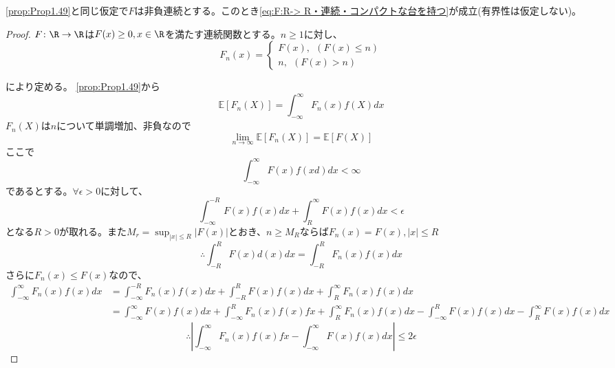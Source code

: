    \ref{prop:Prop1.49}と同じ仮定で$F$は非負連続とする。このとき\eqref{eq:F:R-> R・連続・コンパクトな台を持つ}が成立(有界性は仮定しない)。
\begin{proof}
    $F\colon \R\to \R$は$F(x)\ge 0, x\in \R$を満たす連続関数とする。$n\ge 1$に対し、
\begin{equation}
    F_n(x)
    = 
\begin{cases}
    F(x),\ \ (F(x)\le n)\\
    n,\ \ (F(x)> n)
\end{cases}
\end{equation}
\begin{tikzpicture}
\end{tikzpicture}
    により定める。
    \ref{prop:Prop1.49}から
\begin{equation}
    \mathbb{E}[F_n(X)]= \int_{-\infty}^\infty F_n(x)f(X)dx
\end{equation}
    $F_n(X)$は$n$について単調増加、非負なので
\begin{equation}
    \lim_{n\to \infty} \mathbb{E}[F_n(X)]= \mathbb{E}[F(X)]
\end{equation}
    ここで
\begin{equation}
    \int_{-\infty}^\infty F(x)f(xd)dx< \infty
\end{equation}
    であるとする。$\forall \epsilon> 0$に対して、
\begin{equation}
    \int_{-\infty}^{-R} F(x)f(x)dx+ \int_R^\infty F(x)f(x)dx< \epsilon
\end{equation}
    となる$R> 0$が取れる。また$M_r= \sup_{|x|\le R} |F(x)|$とおき、$n\ge M_R$ならば$F_n(x)= F(x), |x|\le R$
\begin{equation}
    \therefore \int_{-R}^R F(x)d(x)dx= \int_{-R}^R F_n(x)f(x)dx
\end{equation}
    さらに$F_n(x)\le F(x)$なので、
\begin{align}
    \int_{-\infty}^\infty F_n(x)f(x)dx
    &= \int_{-\infty}^{-R} F_n(x)f(x)dx+ \int_{-R}^R F(x)f(x)dx+ \int_R^\infty F_n(x)f(x)dx\\
    &= \int_{-\infty}^\infty F(x)f(x)dx+ \int_{-\infty}^R F_n(x)f(x)fx+ \int_R^\infty F_n(x)f(x)dx- \int_{-\infty}^R F(x)f(x)dx- \int_R^\infty F(x)f(x)dx
\end{align}
\begin{equation}
    \therefore \left|\int_{-\infty}^\infty F_n(x)f(x)fx- \int_{-\infty}^\infty F(x)f(x)dx\right|\le 2\epsilon

\end{equation}
\end{proof}
